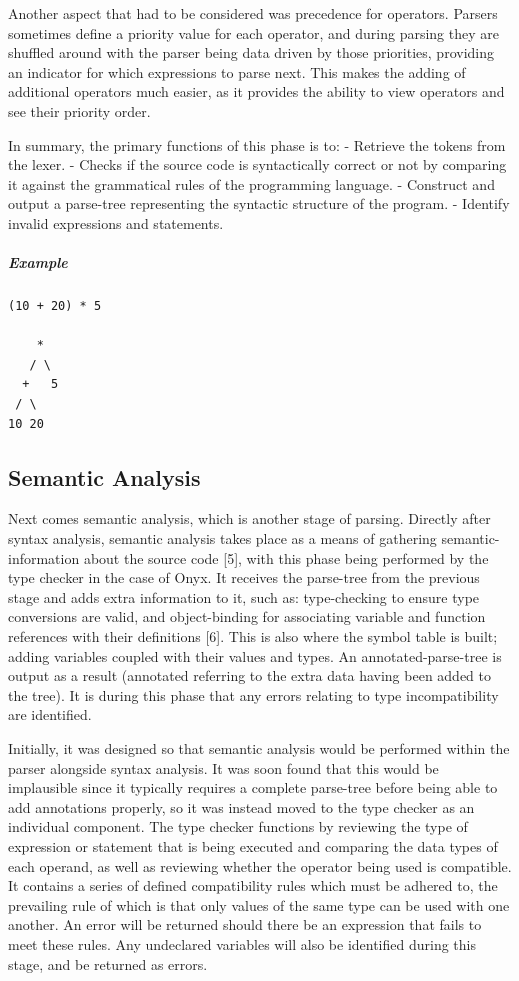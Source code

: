 \documentclass[
]{report}
\begin{document}
Another aspect that had to be considered was precedence for operators.
Parsers sometimes define a priority value for each operator, and during
\gls{parsing} they are shuffled around with the parser being data driven by
those priorities, providing an indicator for which \glspl{expression} to parse
next. This makes the adding of additional operators much easier, as it
provides the ability to view operators and see their priority order.

In summary, the primary functions of this phase is to: - Retrieve the
\glspl{token} from the lexer. - Checks if the source code is syntactically
correct or not by comparing it against the grammatical rules of the
programming language. - Construct and output a \gls{parse-tree} representing
the syntactic structure of the program. - Identify invalid \glspl{expression}
and \glspl{statement}.

\subparagraph{Example}
\begin{verbatim}
(10 + 20) * 5

    *
   / \
  +   5
 / \  
10 20
\end{verbatim}

\subsection{Semantic Analysis}
Next comes semantic analysis, which is another stage of \gls{parsing}.
Directly after syntax analysis, semantic analysis takes place as a means
of gathering \gls{semantic-information} about the source code {[}5{]}, with
this phase being performed by the type checker in the case of Onyx. It
receives the \gls{parse-tree} from the previous stage and adds extra
information to it, such as: \gls{type-checking} to ensure type conversions are
valid, and \gls{object-binding} for associating variable and function
references with their definitions {[}6{]}. This is also where the \gls{symbol}
table is built; adding variables coupled with their values and types. An
\gls{annotated-parse-tree} is output as a result (annotated referring to the
extra data having been added to the tree). It is during this phase that
any errors relating to type incompatibility are identified.

Initially, it was designed so that semantic analysis would be performed
within the parser alongside syntax analysis. It was soon found that this
would be implausible since it typically requires a complete \gls{parse-tree}
before being able to add annotations properly, so it was instead moved
to the type checker as an individual component. The type checker
functions by reviewing the type of \gls{expression} or \gls{statement} that is being
executed and comparing the data types of each operand, as well as
reviewing whether the operator being used is compatible. It contains a
series of defined compatibility rules which must be adhered to, the
prevailing rule of which is that only values of the same type can be
used with one another. An error will be returned should there be an
\gls{expression} that fails to meet these rules. Any undeclared variables will
also be identified during this stage, and be returned as errors.
\end{document}
